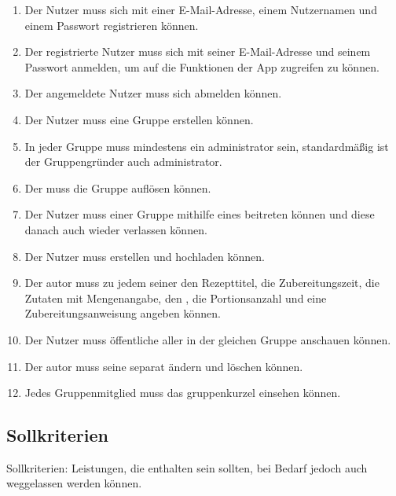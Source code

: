 \documentclass[parskip=full]{scrartcl}
\begin{document}
\begin{enumerate}[start=1,label={$\langle$\bfseries RM\arabic*$\rangle$}, leftmargin = 5em, itemsep=4pt, parsep=4pt]
    \item Der Nutzer muss sich mit einer E-Mail-Adresse, einem Nutzernamen und einem Passwort registrieren können.\label{rm:Registering}
    \item Der registrierte Nutzer muss sich mit seiner E-Mail-Adresse und seinem Passwort anmelden, um auf die Funktionen der App zugreifen zu können. \label{rm:Login}
    \item Der angemeldete Nutzer muss sich abmelden können. \label{rm:Logout}
    \item Der Nutzer muss eine Gruppe erstellen können. \label{rm:GroupCreation}
    \item In jeder Gruppe muss mindestens ein \gls{administrator} sein, standardmäßig ist der Gruppengründer auch \gls{administrator}.\label{rm:GroupAdmin}
    \item Der  muss die Gruppe auflösen können. \label{rm:GroupDeletion}
    \item Der Nutzer muss einer Gruppe mithilfe eines  beitreten können und diese danach auch wieder verlassen können.\label{rm:GroupJoining}
    \item Der Nutzer muss  erstellen und hochladen können. \label{rm:RecipeCreation}
    \item Der \gls{autor} muss zu jedem seiner  den Rezepttitel, die Zubereitungszeit, die Zutaten mit Mengenangabe, den , die Portionsanzahl und eine Zubereitungsanweisung angeben können.\label{rm:RecipeContents}
    \item Der Nutzer muss öffentliche  aller  in der gleichen Gruppe anschauen können.\label{rm:RecipeViewing}
    \item Der \gls{autor} muss seine  separat ändern und löschen können.\label{rm:RecipeManagement}
    \item Jedes Gruppenmitglied muss das \gls{gruppenkurzel} einsehen können.\label{rm:GroupId}
\end{enumerate}

\subsection{Sollkriterien}
Sollkriterien: Leistungen, die enthalten sein sollten, bei Bedarf jedoch auch weggelassen werden können.
\end{document}
